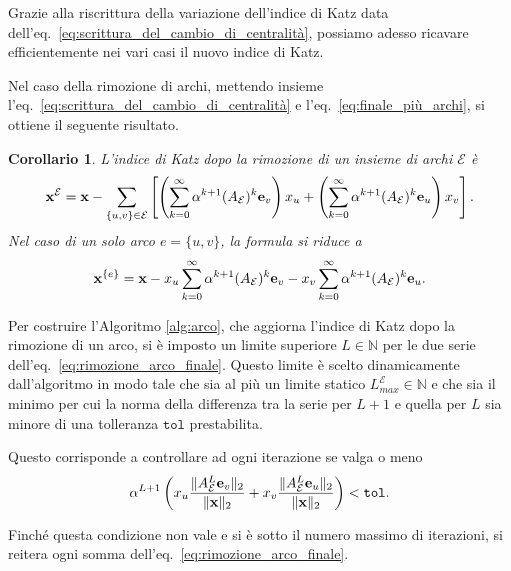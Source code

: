 \documentclass[a4paper]{article}
\newcommand{\NN}{\mathbb{N}}
\newcommand{\evec}{{\bf e}}
\newcommand{\xvec}{{\bf x}}
\newcommand{\cE}{\mathcal{E}}
\newtheorem{corollary}{Corollario}
\begin{document}
	Grazie alla riscrittura della variazione dell'indice di Katz
	data dell'eq.~\eqref{eq:scrittura_del_cambio_di_centralità}, possiamo
	adesso ricavare efficientemente nei vari casi il nuovo indice di Katz.
	
	Nel caso della rimozione di archi, mettendo insieme l'eq.~\eqref{eq:scrittura_del_cambio_di_centralità} e l'eq.~\eqref{eq:finale_più_archi}, si ottiene il seguente risultato.
	
	\begin{corollary}
		L'indice di Katz dopo la rimozione di un insieme
		di archi $\cE$ è
		\begin{equation}
			\xvec^\cE = \xvec - \sum_{\{u,v\}\in \cE} \left[
				\left(\sum_{k=0}^{\infty} \alpha^{k+1}(A_\cE)^k \evec_v \right) x_u 
			+ \left(\sum_{k=0}^{\infty} \alpha^{k+1} (A_\cE)^k \evec_u \right) x_v \right].
		\end{equation}
		Nel caso di un solo arco $e = \{u, v\}$, la formula si
		riduce a
		\begin{equation} \label{eq:rimozione_arco_finale}
			\xvec^{\{e\}} = \xvec -
			x_u \sum_{k=0}^{\infty} \alpha^{k+1}(A_\cE)^k \evec_v 
			- x_v \sum_{k=0}^{\infty} \alpha^{k+1} (A_\cE)^k \evec_u.
		\end{equation}
	\end{corollary}
	
	Per costruire l'Algoritmo \ref{alg:arco}, che aggiorna l'indice di Katz dopo la rimozione
	di un arco, si è imposto un limite superiore $L \in \NN$ per le due serie dell'eq.~\eqref{eq:rimozione_arco_finale}. Questo limite è scelto dinamicamente dall'algoritmo
	in modo tale che sia al più un limite statico $L_{max}^\cE \in \NN$ e che sia il minimo per cui la norma della differenza tra la serie per $L+1$
	e quella per $L$ sia minore di una tolleranza $\texttt{tol}$ prestabilita.
	
	Questo corrisponde a controllare ad ogni iterazione se valga o meno
	\[
		\alpha^{L+1}\left( x_u
		\frac{\|A_\cE^L \evec_v\|_2}{\|\xvec\|_2} +
		x_v \frac{\|A_\cE^L \evec_u\|_2}{\|\xvec\|_2}
		\right) < \texttt{tol}.
	\]
	
	Finché questa condizione non vale e si è sotto il numero massimo di iterazioni, si reitera ogni somma dell'eq.~\eqref{eq:rimozione_arco_finale}.
	
\end{document}
